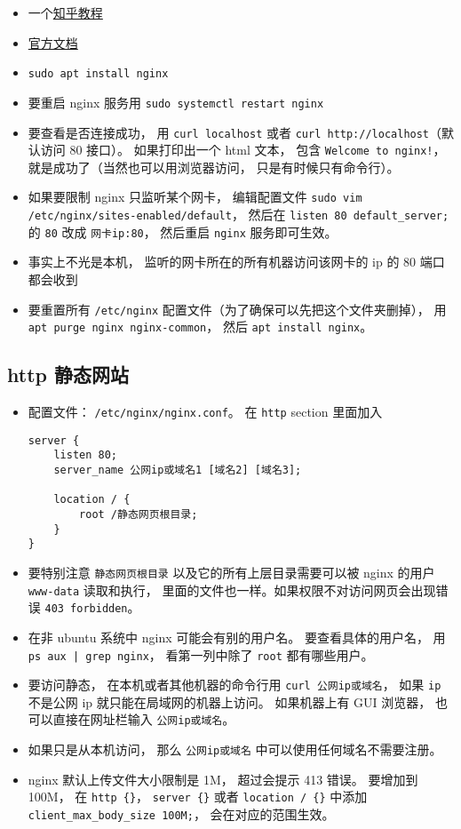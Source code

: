
\begin{issues}
\issueDraft
\end{issues}

\begin{itemize}
\item 一个\href{https://zhuanlan.zhihu.com/p/80600540}{知乎教程}
\item \href{https://nginx.org/en/docs/}{官方文档}
\item \verb`sudo apt install nginx`
\item 要重启 nginx 服务用 \verb`sudo systemctl restart nginx`
\item 要查看是否连接成功， 用 \verb`curl localhost` 或者 \verb`curl http://localhost`（默认访问 80 接口）。 如果打印出一个 html 文本， 包含 \verb`Welcome to nginx!`， 就是成功了（当然也可以用浏览器访问， 只是有时候只有命令行）。
\item 如果要限制 nginx 只监听某个网卡， 编辑配置文件 \verb`sudo vim /etc/nginx/sites-enabled/default`， 然后在 \verb`listen 80 default_server;` 的 \verb`80` 改成 \verb`网卡ip:80`， 然后重启 \verb`nginx` 服务即可生效。
\item 事实上不光是本机， 监听的网卡所在的所有机器访问该网卡的 ip 的 80 端口都会收到
\item 要重置所有 \verb`/etc/nginx` 配置文件（为了确保可以先把这个文件夹删掉）， 用 \verb`apt purge nginx nginx-common`， 然后 \verb`apt install nginx`。
\end{itemize}

\subsection{http 静态网站}
\begin{itemize}
\item 配置文件： \verb`/etc/nginx/nginx.conf`。 在 \verb`http` section 里面加入
\begin{lstlisting}[language=none]
server {
    listen 80;
    server_name 公网ip或域名1 [域名2] [域名3];
    
    location / {
        root /静态网页根目录;
    }
}
\end{lstlisting}
\item 要特别注意 \verb`静态网页根目录` 以及它的所有上层目录需要可以被 nginx 的用户 \verb`www-data` 读取和执行， 里面的文件也一样。如果权限不对访问网页会出现错误 \verb`403 forbidden`。
\item 在非 ubuntu 系统中 nginx 可能会有别的用户名。  要查看具体的用户名， 用 \verb`ps aux | grep nginx`， 看第一列中除了 \verb`root` 都有哪些用户。
\item 要访问静态， 在本机或者其他机器的命令行用 \verb`curl 公网ip或域名`， 如果 \verb`ip` 不是公网 ip 就只能在局域网的机器上访问。 如果机器上有 GUI 浏览器， 也可以直接在网址栏输入 \verb`公网ip或域名`。
\item 如果只是从本机访问， 那么 \verb`公网ip或域名` 中可以使用任何域名不需要注册。
\item nginx 默认上传文件大小限制是 1M， 超过会提示 413 错误。 要增加到 100M， 在 \verb`http {}`， \verb`server {}` 或者 \verb`location / {}` 中添加 \verb`client_max_body_size 100M;`， 会在对应的范围生效。
\end{itemize}

